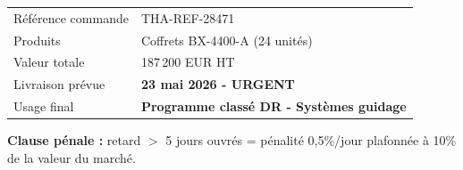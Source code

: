 \documentclass[11pt]{article}
\begin{document}
\lhThales
{}

\begin{tabularx}{\linewidth}{@{}p{5cm}Y@{}}
 & \\[2pt]
\hline
Référence commande & THA-REF-28471\\
Produits & Coffrets BX-4400-A (24 unités)\\
Valeur totale & 187\,200 EUR HT\\
Livraison prévue & \textcolor{warnborder}{\textbf{23 mai 2026 - URGENT}}\\
Usage final & \textcolor{brand}{\textbf{Programme classé DR - Systèmes guidage}}\\
\end{tabularx}

\vspace{10pt}
\begin{okbox}
\textbf{Clause pénale :} retard $>$ 5 jours ouvrés = pénalité 0,5\%/jour plafonnée à 10\% de la valeur du marché.
\end{okbox}
\docfooter
\end{document}

